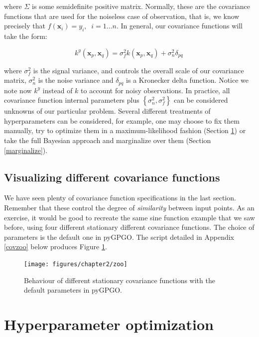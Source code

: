 \documentclass[10pt,a4paper,twoside]{book}
\begin{document}
where $\Sigma$ is some semidefinite positive matrix. Normally, these are the covariance functions that are used for the noiseless case of observation, that is, we know precisely that $f(\boldsymbol{x}_i) = y_i, \;\; i=1\dots n$. In general, our covariance functions will take the form:

\begin{equation}
k^y(\boldsymbol{x}_p, \boldsymbol{x}_q) = \sigma^2_f k(\boldsymbol{x}_p, \boldsymbol{x}_q) + \sigma^2_n \delta_{pq} \,
\end{equation}

where $\sigma^2_f$ is the signal variance, and controls the overall scale of our covariance matrix, $\sigma^2_n$ is the noise variance and $\delta_{pq}$ is a Kronecker delta function. Notice we note now $k^y$ instead of $k$ to account for noisy observations. In practice, all covariance function internal parameters plus $\left\lbrace\sigma_n^2, \sigma^2_f\right\rbrace$ can be considered unknowns of our particular problem. Several different treatments of hyperparameters can be considered, for example, one may choose to fix them manually, try to optimize them in a maximum-likelihood fashion (Section \ref{hyper}) or take the full Bayesian approach and marginalize over them (Section \ref{marginalize}).


\subsection{Visualizing different covariance functions}

We have seen plenty of covariance function specifications in the last section. Remember that these control the degree of \textit{similarity} between input points. As an exercise, it would be good to recreate the same sine function example that we saw before, using four different stationary different covariance functions. The choice of parameters is the default one in pyGPGO. The script detailed in Appendix \ref{covzoo} below produces Figure \ref{fig:zoo}. \\


\begin{figure}
\caption{Behaviour of different stationary covariance functions with the default parameters in pyGPGO.}
\label{fig:zoo}
\texttt{[image: figures/chapter2/zoo]}
\end{figure}

\section{Hyperparameter optimization}
\label{hyper}
\end{document}
